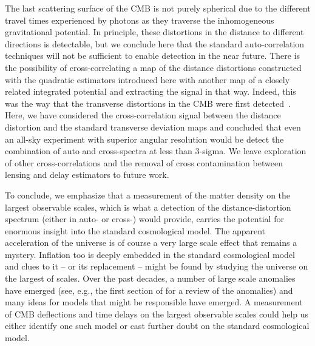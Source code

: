 \documentclass[prd,amsmath,amssymb,floatfix,superscriptaddress,nofootinbib,twocolumn]{revtex4-1}
\begin{document}
The last scattering surface of the CMB is not purely spherical due to the different travel times experienced by photons as they traverse the inhomogeneous gravitational potential. In principle, these distortions in the distance to different directions is detectable, but we conclude here that the standard auto-correlation techniques will not be sufficient to enable detection in the near future. There is the possibility of cross-correlating a map of the distance distortions constructed with the quadratic estimators introduced here with another map of a closely related integrated potential and extracting the signal in that way. Indeed, this was the way that the transverse distortions in the CMB were first detected~\cite{Smith:2007rg}. Here, we have considered  the cross-correlation signal between the distance distortion and the standard transverse deviation maps and concluded that even an all-sky experiment with superior angular resolution would be detect the combination of auto and cross-spectra at less than 3-sigma. We leave exploration of other cross-correlations and the removal of cross contamination between lensing and delay estimators to future work.

To conclude, we emphasize that a measurement of the matter density on the largest observable scales, which is what a detection of the distance-distortion spectrum (either in auto- or cross-) would provide, carries the potential for enormous insight into the standard cosmological model. The apparent acceleration of the universe is of course a very large scale effect that remains a mystery. Inflation too is deeply embedded in the standard cosmological model and clues to it -- or its replacement -- might be found by studying the universe on the largest of scales. Over the past decades, a number of large scale anomalies have emerged (see, e.g., the first section of \citet{Hansen:2018pgg} for a review of the anomalies) and many ideas for models that might be responsible have emerged. A measurement of CMB deflections and time delays on the largest observable scales could help us either identify one such model or cast further doubt on the standard cosmological model.
\end{document}
